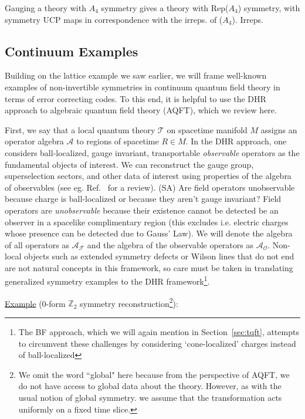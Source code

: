 \documentclass{article}
\newcommand{\mA}{\mathcal{A}}
\theoremstyle{definition}
\newcommand{\SA}[1]{{\color{sulaiman}\footnotesize{(SA) #1}}}
\begin{document}
Gauging a theory with $A_4$ symmetry gives a theory with Rep($A_4$) symmetry, with symmetry UCP maps in correspondence with the irreps. of ($A_4$).  \color{brown}Irreps. \color{black}






  \subsection{Continuum Examples}

  Building on the lattice example we saw earlier, we will frame well-known examples
  of non-invertible symmetries in continuum quantum field theory in terms of error
  correcting codes. To this end, it is helpful to use the DHR approach to algebraic
  quantum field theory (AQFT), which we review here.

  First, we say that a local quantum theory $\mathcal{T}$ on spacetime manifold $M$
  assigns an operator algebra $\mA$ to regions of spacetime $R\in M$. In the DHR
  approach, one considers ball-localized, gauge invariant, transportable \textit{observable}
  operators as the fundamental objects of interest. We can reconstruct the gauge
  group, superselection sectors, and other data of interest using properties of the
  algebra of observables (see eg. Ref.~\cite{haag2012local, halvorson2006algebraicquantumfieldtheory}
  for a review). \SA{Are field operators unobservable because charge is ball-localized or because they aren't gauge invariant?}
  Field operators are \textit{unobservable} because their existence cannot be
  detected be an observer in a spacelike complimentary region (this excludes i.e.
  electric charges whose presence can be detected due to Gauss' Law). We will denote
  the algebra of all operators as $\mA_{\mathcal{F}}$ and the algebra of the observable
  operators as $\mathcal{A}_{\mathcal{O}}$. Non-local objects such as extended
  symmetry defects or Wilson lines that do not end are not natural concepts in
  this framework, so care must be taken in translating generalized symmetry examples
  to the DHR framework\footnote{The BF approach, which we will again mention in Section~\ref{sec:tqft},
  attempts to circumvent these challenges by considering `cone-localized'
  charges instead of ball-localized}.

  \underline{Example} (0-form $\mathbb{Z}_{2}$ symmetry reconstruction\footnote{We
  omit the word ``global" here because from the perspective of AQFT, we do not
  have access to global data about the theory. However, as with the usual notion
  of global symmetry. we assume that the transformation acts uniformly on a fixed
  time slice.}):
\end{document}
